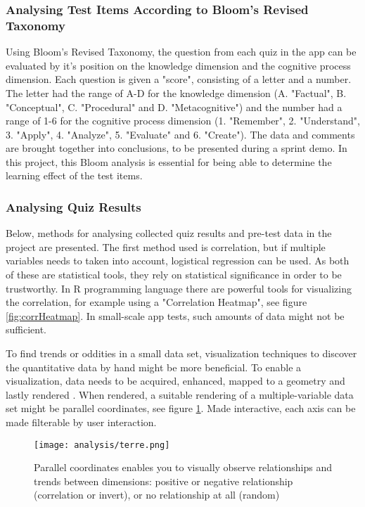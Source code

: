 \subsubsection{Analysing Test Items According to Bloom's Revised Taxonomy}
Using Bloom's Revised Taxonomy, the question from each quiz in the app can be evaluated by it's position on the knowledge dimension and the cognitive process dimension. Each question is given a "score", consisting of a letter and a number. The letter had the range of A-D for the knowledge dimension (A. "Factual", B. "Conceptual", C. "Procedural" and D. "Metacognitive") and the number had a range of 1-6 for the cognitive process dimension (1. "Remember", 2. "Understand", 3. "Apply", 4. "Analyze", 5. "Evaluate" and 6. "Create"). The data and comments are brought together into conclusions, to be presented during a sprint demo. In this project, this Bloom analysis is essential for being able to determine the learning effect of the test items.

\subsubsection{Analysing Quiz Results}
Below, methods for analysing collected quiz results and pre-test data in the project are presented. The first method used is correlation, but if multiple variables needs to taken into account, logistical regression can be used. As both of these are statistical tools, they rely on statistical significance in order to be trustworthy. In R programming language there are powerful tools for visualizing the correlation, for example using a "Correlation Heatmap", see figure \ref{fig:corrHeatmap}. In small-scale app tests, such amounts of data might not be sufficient.

To find trends or oddities in a small data set, visualization techniques to discover the quantitative data by hand might be more beneficial. To enable a visualization, data needs to be acquired, enhanced, mapped to a geometry and lastly rendered \citep{timo-ropinski-liu}. When rendered, a suitable rendering of a multiple-variable data set might be parallel coordinates, see figure \ref{fig:uneTerre}. Made interactive, each axis can be made filterable by user interaction.

\begin{figure}[h]
    \centering
    \texttt{[image: analysis/terre.png]}
    \caption{Parallel coordinates enables you to visually observe relationships and trends between dimensions: positive or negative relationship (correlation or invert), or no relationship at all (random) \citep{une-terre}}
    \label{fig:uneTerre}
\end{figure}

